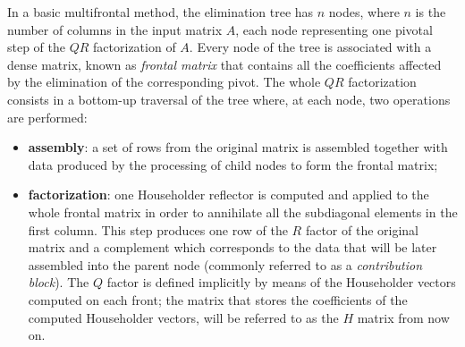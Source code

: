 \documentclass[11pt]{article}
\begin{document}
In a basic multifrontal method, the elimination tree has $n$ nodes,
where $n$ is the number of columns in the input matrix $A$, each node
representing one pivotal step of the $QR$ factorization of $A$. Every
node of the tree is associated with a dense matrix, known as {\it
  frontal matrix} that contains all the coefficients affected by the
elimination of the corresponding pivot. The whole $QR$ factorization
consists in a bottom-up traversal of the tree where, at each node, two
operations are performed:

\begin{itemize}
\item {\bf assembly}: a set of rows from the original matrix
  is assembled together with data produced by the processing of child
  nodes to form the frontal matrix;
\item {\bf factorization}: one Householder reflector is computed and
  applied to the whole frontal matrix in order to annihilate all the
  subdiagonal elements in the first column. This step produces one row
  of the $R$ factor of the original matrix and a complement which
  corresponds to the data that will be later assembled into the parent
  node (commonly referred to as a {\it contribution block}). The $Q$
  factor is defined implicitly by means of the Householder vectors
  computed on each front; the matrix that stores the coefficients of
  the computed Householder vectors, will be referred to as the $H$
  matrix from now on.
\end{itemize}
\end{document}
